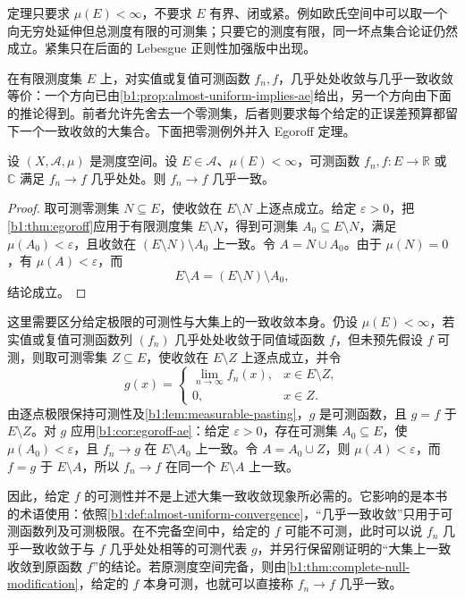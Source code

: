 \ProseParagraphBreak

定理只要求 \(\mu(E)<\infty\)，不要求 \(E\) 有界、闭或紧。例如欧氏空间中可以取一个向无穷处延伸但总测度有限的可测集；只要它的测度有限，同一坏点集合论证仍然成立。紧集只在后面的 Lebesgue 正则性加强版中出现。

\ProseParagraphBreak

在有限测度集 \(E\) 上，对实值或复值可测函数 \(f_n,f\)，几乎处处收敛与几乎一致收敛等价：一个方向已由\cref{b1:prop:almost-uniform-implies-ae}给出，另一个方向由下面的推论得到。前者允许先舍去一个零测集，后者则要求每个给定的正误差预算都留下一个一致收敛的大集合。下面把零测例外并入 Egoroff 定理。

\begin{corollary}
\label{b1:cor:egoroff-ae}
设 \((X,\mathcal A,\mu)\) 是测度空间。设 \(E\in\mathcal A\)、\(\mu(E)<\infty\)，可测函数
\(f_n,f:E\rightarrow\mathbb R\) 或 \(\mathbb C\) 满足
\(f_n\to f\) 几乎处处。则 \(f_n\to f\) 几乎一致。
\end{corollary}
\begin{proof}
取可测零测集 \(N\subseteq E\)，使收敛在 \(E\setminus N\) 上逐点成立。给定 \(\varepsilon>0\)，把%
\cref{b1:thm:egoroff}应用于有限测度集 \(E\setminus N\)，得到可测集 \(A_0\subseteq E\setminus N\)，满足
\(\mu(A_0)<\varepsilon\)，且收敛在
\((E\setminus N)\setminus A_0\) 上一致。令 \(A=N\cup A_0\)。由于
\(\mu(N)=0\)，有 \(\mu(A)<\varepsilon\)，而
\[
E\setminus A=(E\setminus N)\setminus A_0,
\]
结论成立。
\end{proof}

这里需要区分给定极限的可测性与大集上的一致收敛本身。仍设 \(\mu(E)<\infty\)，若实值或复值可测函数列 \((f_n)\) 几乎处处收敛于同值域函数 \(f\)，但未预先假设 \(f\) 可测，则取可测零集 \(Z\subseteq E\)，使收敛在 \(E\setminus Z\) 上逐点成立，并令
\[
g(x)=
\begin{cases}
\lim_{n\to\infty}f_n(x),&x\in E\setminus Z,\\
0,&x\in Z.
\end{cases}
\]
由逐点极限保持可测性及\cref{b1:lem:measurable-pasting}，\(g\) 是可测函数，且 \(g=f\) 于 \(E\setminus Z\)。对 \(g\) 应用\cref{b1:cor:egoroff-ae}：给定 \(\varepsilon>0\)，存在可测集 \(A_0\subseteq E\)，使 \(\mu(A_0)<\varepsilon\)，且 \(f_n\to g\) 在 \(E\setminus A_0\) 上一致。令 \(A=A_0\cup Z\)，则 \(\mu(A)<\varepsilon\)，而 \(f=g\) 于 \(E\setminus A\)，所以 \(f_n\to f\) 在同一个 \(E\setminus A\) 上一致。

\ProseParagraphBreak

因此，给定 \(f\) 的可测性并不是上述大集一致收敛现象所必需的。它影响的是本书的术语使用：依照\cref{b1:def:almost-uniform-convergence}，“几乎一致收敛”只用于可测函数列及可测极限。在不完备空间中，给定的 \(f\) 可能不可测，此时可以说 \(f_n\) 几乎一致收敛于与 \(f\) 几乎处处相等的可测代表 \(g\)，并另行保留刚证明的“大集上一致收敛到原函数 \(f\)”的结论。若原测度空间完备，则由\cref{b1:thm:complete-null-modification}，给定的 \(f\) 本身可测，也就可以直接称 \(f_n\to f\) 几乎一致。

